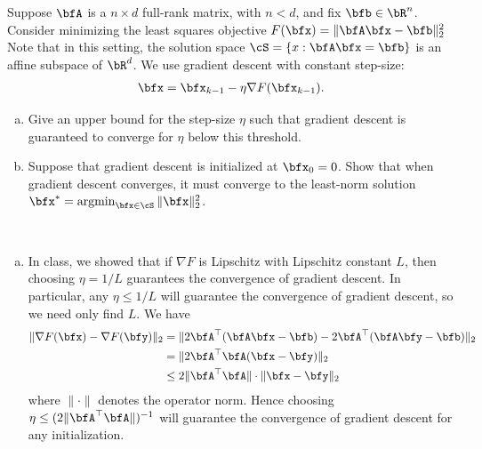 \begin{homework}[e]
  \prob Suppose $\bfA$ is a $n\times d$ full-rank matrix, with $n < d$, and fix $\bfb\in \bR^n$. Consider minimizing the least squares objective $F(\bfx) = \|\bfA\bfx - \bfb\|^2_2$ Note that in this setting, the solution space $\cS = \{x : \bfA\bfx = \bfb\}$ is an affine subspace of $\bR^d$. We use gradient descent with constant step-size:
  \begin{align*}
    \bfx = \bfx_{k-1} - \eta \nabla F(\bfx_{k-1}).
  \end{align*}
  \begin{enumerate}[(a)]
    \item Give an upper bound for the step-size $\eta$ such that gradient descent is guaranteed to converge for $\eta$ below this threshold.
    \item Suppose that gradient descent is initialized at $\bfx_0 = 0$. Show that when gradient descent converges, it must converge to the least-norm solution $\bfx^* = \operatorname{argmin}_{\bfx \in \cS} \|\bfx\|^2_2$.
  \end{enumerate}
  \begin{prf}$ $
    \begin{enumerate}[(a)]
      \item In class, we showed that if $\nabla F$ is Lipschitz with Lipschitz constant $L$, then choosing $\eta = 1/L$ guarantees the convergence of gradient descent. In particular, any $\eta \leq 1/L$ will guarantee the convergence of gradient descent, so we need only find $L$. We have
        \begin{align*}
        \|\nabla F(\bfx) - \nabla F(\bfy)\|_2 
          &= \|2\bfA^\top(\bfA \bfx - \bfb) - 2\bfA^\top(\bfA \bfy - \bfb)\|_2 \\
          &= \|2\bfA^\top \bfA(\bfx - \bfy)\|_2 \\
          &\leq 2\|\bfA^\top \bfA\|\cdot \|\bfx - \bfy\|_2
        \end{align*}
        where $\|\cdot\|$ denotes the operator norm. Hence choosing $\eta \leq (2\|\bfA^\top\bfA\|)^{-1}$ will guarantee the convergence of gradient descent for any initialization.


\end{enumerate}
\end{prf}
\end{homework}
